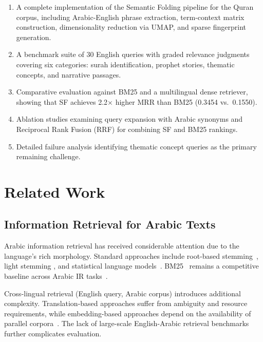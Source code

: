\documentclass[conference]{IEEEtran}
\begin{document}
\begin{enumerate}
  \item A complete implementation of the Semantic Folding pipeline for
        the Quran corpus, including Arabic-English phrase extraction,
        term-context matrix construction, dimensionality reduction via
        UMAP, and sparse fingerprint generation.
  \item A benchmark suite of 30 English queries with graded relevance
        judgments covering six categories: surah identification, prophet
        stories, thematic concepts, and narrative passages.
  \item Comparative evaluation against BM25 and a multilingual dense
        retriever, showing that SF achieves 2.2$\times$ higher MRR than
        BM25 (0.3454 vs.~0.1550).
  \item Ablation studies examining query expansion with Arabic synonyms
        and Reciprocal Rank Fusion (RRF) for combining SF and BM25
        rankings.
  \item Detailed failure analysis identifying thematic concept queries
        as the primary remaining challenge.
\end{enumerate}

\section{Related Work}

\subsection{Information Retrieval for Arabic Texts}

Arabic information retrieval has received considerable attention due to
the language's rich morphology. Standard approaches include
root-based stemming~\cite{taghva2005arabic}, light stemming
\cite{larkey2002stemming}, and statistical language
models~\cite{zhai2008statistical}. BM25~\cite{robertson2009bm25} remains
a competitive baseline across Arabic IR tasks~\cite{benzahia2020bm25}.

Cross-lingual retrieval (English query, Arabic corpus) introduces
additional complexity. Translation-based approaches suffer from ambiguity
and resource requirements, while embedding-based approaches depend on
the availability of parallel corpora~\cite{aly2022cross}. The lack of
large-scale English-Arabic retrieval benchmarks further complicates
evaluation.
\end{document}
